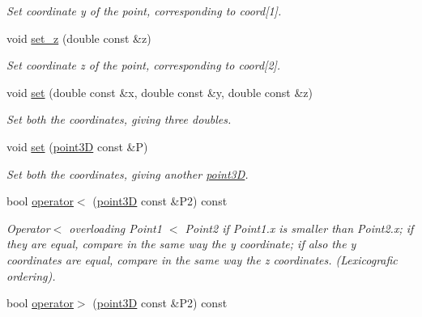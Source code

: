 \begin{DoxyCompactItemize}
\begin{DoxyCompactList}\small\item\em Set coordinate y of the point, corresponding to coord\mbox{[}1\mbox{]}. \item\end{DoxyCompactList}\item 
\hypertarget{classpoint3D_a6359de50dcc0716941d02d57799c4bc3}{
void \hyperlink{classpoint3D_a6359de50dcc0716941d02d57799c4bc3}{set\_\-z} (double const \&z)}
\label{classpoint3D_a6359de50dcc0716941d02d57799c4bc3}

\begin{DoxyCompactList}\small\item\em Set coordinate z of the point, corresponding to coord\mbox{[}2\mbox{]}. \item\end{DoxyCompactList}\item 
\hypertarget{classpoint3D_a375332b1ad9dbff8b4e695c0d14e4463}{
void \hyperlink{classpoint3D_a375332b1ad9dbff8b4e695c0d14e4463}{set} (double const \&x, double const \&y, double const \&z)}
\label{classpoint3D_a375332b1ad9dbff8b4e695c0d14e4463}

\begin{DoxyCompactList}\small\item\em Set both the coordinates, giving three doubles. \item\end{DoxyCompactList}\item 
\hypertarget{classpoint3D_a1b6cc8caa45fd5bd64cb25363ce2f39d}{
void \hyperlink{classpoint3D_a1b6cc8caa45fd5bd64cb25363ce2f39d}{set} (\hyperlink{classpoint3D}{point3D} const \&P)}
\label{classpoint3D_a1b6cc8caa45fd5bd64cb25363ce2f39d}

\begin{DoxyCompactList}\small\item\em Set both the coordinates, giving another \hyperlink{classpoint3D}{point3D}. \item\end{DoxyCompactList}\item 
\hypertarget{classpoint3D_ad6f5bfb1ee14fb59aaeb46480314cff9}{
bool \hyperlink{classpoint3D_ad6f5bfb1ee14fb59aaeb46480314cff9}{operator$<$} (\hyperlink{classpoint3D}{point3D} const \&P2) const }
\label{classpoint3D_ad6f5bfb1ee14fb59aaeb46480314cff9}

\begin{DoxyCompactList}\small\item\em Operator$<$ overloading  Point1 $<$ Point2 if Point1.x is smaller than Point2.x; if they are equal, compare in the same way the y coordinate; if also the y coordinates are equal, compare in the same way the z coordinates. (Lexicografic ordering). \item\end{DoxyCompactList}\item 
\hypertarget{classpoint3D_a143a35ae1376611e523687ab583533b2}{
bool \hyperlink{classpoint3D_a143a35ae1376611e523687ab583533b2}{operator$>$} (\hyperlink{classpoint3D}{point3D} const \&P2) const }
\label{classpoint3D_a143a35ae1376611e523687ab583533b2}


\end{DoxyCompactItemize}
